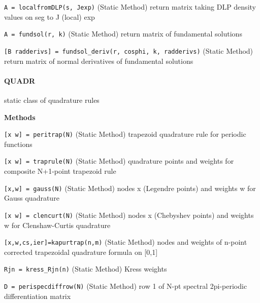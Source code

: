 {\tt A = localfromDLP(s, Jexp)} (Static Method) return matrix taking DLP density
values on seg to J (local) exp

{\tt A = fundsol(r, k)} (Static Method) return matrix of fundamental
solutions

{\tt [B radderivs] = fundsol\_deriv(r, cosphi, k, radderivs)} (Static Method) return
matrix of normal derivatives of fundamental solutions 

\newpage

\paragraph{QUADR} static class of quadrature rules

\textbf{Methods}

{\tt [x w] = peritrap(N)} (Static Method) trapezoid quadrature rule for periodic
functions

{\tt [x w] = traprule(N)} (Static Method) quadrature points and weights for composite
N+1-point trapezoid rule

{\tt [x,w] = gauss(N)} (Static Method) nodes x (Legendre points) and weights w 
for Gauss quadrature

{\tt [x w] = clencurt(N)} (Static Method) nodes x (Chebyshev points) and weights
w for Clenshaw-Curtis quadrature

{\tt [x,w,cs,ier]=kapurtrap(n,m)} (Static Method) nodes and weights of n-point
corrected trapezoidal quadrature formula on [0,1]

{\tt Rjn = kress\_Rjn(n)} (Static Method) Kress weights

{\tt D = perispecdiffrow(N)} (Static Method) row 1 of N-pt spectral
2pi-periodic differentiation matrix















